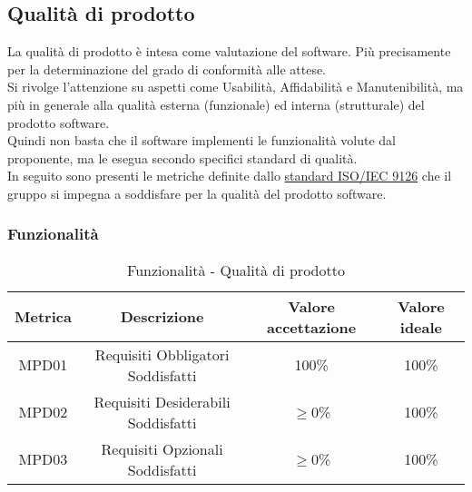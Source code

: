 \documentclass[10pt]{article}
\begin{document}
\begin{justify}
\subsection{Qualità di prodotto}\label{qpd}
La qualità di prodotto è intesa come valutazione del software. Più precisamente per la determinazione del grado di conformità alle attese.\\
Si rivolge l'attenzione su aspetti come Usabilità, Affidabilità e Manutenibilità, ma più in generale alla qualità esterna (funzionale) ed interna (strutturale) del prodotto software.\\
Quindi non basta che il software implementi le funzionalità volute dal proponente, ma le esegua secondo specifici standard di qualità.\\
In seguito sono presenti le metriche definite dallo \hyperref[ISO 9126]{standard ISO/IEC 9126} che il gruppo si impegna a soddisfare per la qualità del prodotto software.
\subsubsection{Funzionalità}
\begin{table}[H]
  \centering
\begin{tabular}{|c|c|c|c|}
  \hline
  \textbf{Metrica} & \textbf{Descrizione} & \textbf{Valore accettazione} & \textbf{Valore ideale}\\
  \hline
  MPD01 & Requisiti Obbligatori Soddisfatti & 100\% & 100\%\\
  \hline
  MPD02 & Requisiti Desiderabili Soddisfatti  & $\geq$0\% & 100\% \\
  \hline
  MPD03 & Requisiti Opzionali Soddisfatti & $\geq$0\% & 100\% \\
  \hline
\end{tabular}
\caption{Funzionalità - Qualità di prodotto}
\label{tab:funzionalità}
\end{table}



\end{justify}
\end{document}
